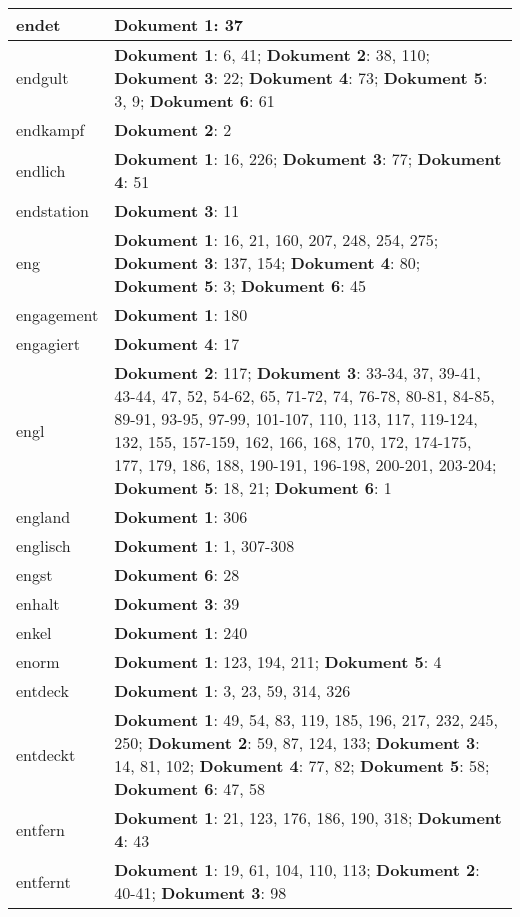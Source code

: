 \documentclass[a5paper]{article}
\begin{document}
\begin{longtable}[l]{|l|p{3in}|}
\hline
endet & \textbf{Dokument 1}: 37 \\
\hline
endgult & \textbf{Dokument 1}: 6, 41; \textbf{Dokument 2}: 38, 110; \textbf{Dokument 3}: 22; \textbf{Dokument 4}: 73; \textbf{Dokument 5}: 3, 9; \textbf{Dokument 6}: 61 \\
\hline
endkampf & \textbf{Dokument 2}: 2 \\
\hline
endlich & \textbf{Dokument 1}: 16, 226; \textbf{Dokument 3}: 77; \textbf{Dokument 4}: 51 \\
\hline
endstation & \textbf{Dokument 3}: 11 \\
\hline
eng & \textbf{Dokument 1}: 16, 21, 160, 207, 248, 254, 275; \textbf{Dokument 3}: 137, 154; \textbf{Dokument 4}: 80; \textbf{Dokument 5}: 3; \textbf{Dokument 6}: 45 \\
\hline
engagement & \textbf{Dokument 1}: 180 \\
\hline
engagiert & \textbf{Dokument 4}: 17 \\
\hline
engl & \textbf{Dokument 2}: 117; \textbf{Dokument 3}: 33-34, 37, 39-41, 43-44, 47, 52, 54-62, 65, 71-72, 74, 76-78, 80-81, 84-85, 89-91, 93-95, 97-99, 101-107, 110, 113, 117, 119-124, 132, 155, 157-159, 162, 166, 168, 170, 172, 174-175, 177, 179, 186, 188, 190-191, 196-198, 200-201, 203-204; \textbf{Dokument 5}: 18, 21; \textbf{Dokument 6}: 1 \\
\hline
england & \textbf{Dokument 1}: 306 \\
\hline
englisch & \textbf{Dokument 1}: 1, 307-308 \\
\hline
engst & \textbf{Dokument 6}: 28 \\
\hline
enhalt & \textbf{Dokument 3}: 39 \\
\hline
enkel & \textbf{Dokument 1}: 240 \\
\hline
enorm & \textbf{Dokument 1}: 123, 194, 211; \textbf{Dokument 5}: 4 \\
\hline
entdeck & \textbf{Dokument 1}: 3, 23, 59, 314, 326 \\
\hline
entdeckt & \textbf{Dokument 1}: 49, 54, 83, 119, 185, 196, 217, 232, 245, 250; \textbf{Dokument 2}: 59, 87, 124, 133; \textbf{Dokument 3}: 14, 81, 102; \textbf{Dokument 4}: 77, 82; \textbf{Dokument 5}: 58; \textbf{Dokument 6}: 47, 58 \\
\hline
entfern & \textbf{Dokument 1}: 21, 123, 176, 186, 190, 318; \textbf{Dokument 4}: 43 \\
\hline
entfernt & \textbf{Dokument 1}: 19, 61, 104, 110, 113; \textbf{Dokument 2}: 40-41; \textbf{Dokument 3}: 98 \\

\end{longtable}
\end{document}
